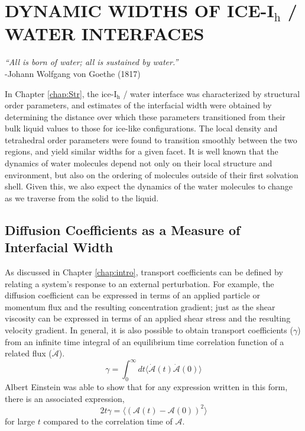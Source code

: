 \chapter{DYNAMIC WIDTHS OF ICE-I$_\mathrm{h}$ / WATER
  INTERFACES}\label{chap:Dyn}


\begin{flushright}
\textit{``All is born of water; all is sustained by water.''} \\
-Johann Wolfgang von Goethe (1817) \\
\end{flushright}


In Chapter \ref{chap:Str}, the ice-I$_\mathrm{h}$ / water interface
was characterized by structural order parameters, and estimates of the
interfacial width were obtained by determining the distance over which
these parameters transitioned from their bulk liquid values to those
for ice-like configurations. The local density and tetrahedral order
parameters were found to transition smoothly between the two regions,
and yield similar widths for a given facet.  It is well known that the
dynamics of water molecules depend not only on their local structure
and environment, but also on the ordering of molecules outside of
their first solvation shell. Given this, we also expect the dynamics of the
water molecules to change as we traverse from the solid to the
liquid.

\section{Diffusion Coefficients as a Measure of Interfacial Width}
As discussed in Chapter \ref{chap:intro}, transport coefficients can
be defined by relating a system's response to an external
perturbation. For example, the diffusion coefficient can be expressed
in terms of an applied particle or momentum flux and the resulting
concentration gradient; just as the shear viscosity can be expressed
in terms of an applied shear stress and the resulting velocity
gradient. In general, it is also possible to obtain transport
coefficients ($\gamma$) from an infinite time integral of an
equilibrium time correlation function of a related flux
($\mathscr{\dot{A}}$).
\begin{equation}\label{eq:transport1}
\gamma = \int_0^{\infty} dt \langle \dot{\mathscr{A}}(t)
\dot{\mathscr{A}}(0)\rangle 
\end{equation}
Albert Einstein was able to show that for any expression written in
this form, there is an associated expression,
\begin{equation}\label{eq:transport2}
2t\gamma = \langle (\mathscr{A}(t)-\mathscr{A}(0))^2 \rangle
\end{equation}
for large $t$ compared to the correlation time of $\mathscr{A}$. 

